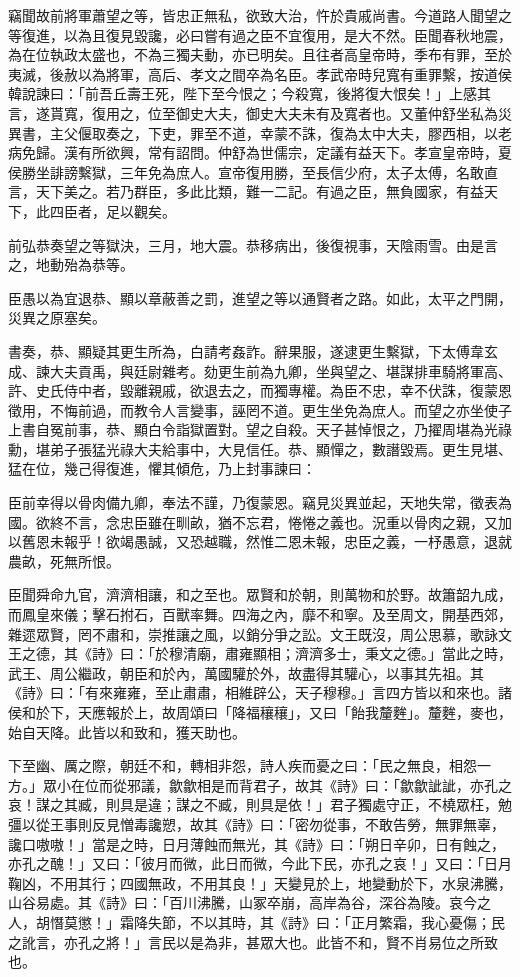 \begin{pinyinscope}
竊聞故前將軍蕭望之等，皆忠正無私，欲致大治，忤於貴戚尚書。今道路人聞望之等復進，以為且復見毀讒，必曰嘗有過之臣不宜復用，是大不然。臣聞春秋地震，為在位執政太盛也，不為三獨夫動，亦已明矣。且往者高皇帝時，季布有罪，至於夷滅，後赦以為將軍，高后、孝文之間卒為名臣。孝武帝時兒寬有重罪繫，按道侯韓說諫曰：「前吾丘壽王死，陛下至今恨之；今殺寬，後將復大恨矣！」上感其言，遂貰寬，復用之，位至御史大夫，御史大夫未有及寬者也。又董仲舒坐私為災異書，主父偃取奏之，下吏，罪至不道，幸蒙不誅，復為太中大夫，膠西相，以老病免歸。漢有所欲興，常有詔問。仲舒為世儒宗，定議有益天下。孝宣皇帝時，夏侯勝坐誹謗繫獄，三年免為庶人。宣帝復用勝，至長信少府，太子太傅，名敢直言，天下美之。若乃群臣，多此比類，難一二記。有過之臣，無負國家，有益天下，此四臣者，足以觀矣。

前弘恭奏望之等獄決，三月，地大震。恭移病出，後復視事，天陰雨雪。由是言之，地動殆為恭等。

臣愚以為宜退恭、顯以章蔽善之罰，進望之等以通賢者之路。如此，太平之門開，災異之原塞矣。

書奏，恭、顯疑其更生所為，白請考姦詐。辭果服，遂逮更生繫獄，下太傅韋玄成、諫大夫貢禹，與廷尉雜考。劾更生前為九卿，坐與望之、堪謀排車騎將軍高、許、史氏侍中者，毀離親戚，欲退去之，而獨專權。為臣不忠，幸不伏誅，復蒙恩徵用，不悔前過，而教令人言變事，誣罔不道。更生坐免為庶人。而望之亦坐使子上書自冤前事，恭、顯白令詣獄置對。望之自殺。天子甚悼恨之，乃擢周堪為光祿勳，堪弟子張猛光祿大夫給事中，大見信任。恭、顯憚之，數譖毀焉。更生見堪、猛在位，幾己得復進，懼其傾危，乃上封事諫曰：

臣前幸得以骨肉備九卿，奉法不謹，乃復蒙恩。竊見災異並起，天地失常，徵表為國。欲終不言，念忠臣雖在甽畝，猶不忘君，惓惓之義也。況重以骨肉之親，又加以舊恩未報乎！欲竭愚誠，又恐越職，然惟二恩未報，忠臣之義，一杼愚意，退就農畝，死無所恨。

臣聞舜命九官，濟濟相讓，和之至也。眾賢和於朝，則萬物和於野。故簫韶九成，而鳳皇來儀；擊石拊石，百獸率舞。四海之內，靡不和寧。及至周文，開基西郊，雜遝眾賢，罔不肅和，崇推讓之風，以銷分爭之訟。文王既沒，周公思慕，歌詠文王之德，其《詩》曰：「於穆清廟，肅雍顯相；濟濟多士，秉文之德。」當此之時，武王、周公繼政，朝臣和於內，萬國驩於外，故盡得其驩心，以事其先祖。其《詩》曰：「有來雍雍，至止肅肅，相維辟公，天子穆穆。」言四方皆以和來也。諸侯和於下，天應報於上，故周頌曰「降福穰穰」，又曰「飴我釐麰」。釐麰，麥也，始自天降。此皆以和致和，獲天助也。

下至幽、厲之際，朝廷不和，轉相非怨，詩人疾而憂之曰：「民之無良，相怨一方。」眾小在位而從邪議，歙歙相是而背君子，故其《詩》曰：「歙歙訿訿，亦孔之哀！謀之其臧，則具是違；謀之不臧，則具是依！」君子獨處守正，不橈眾枉，勉彊以從王事則反見憎毒讒愬，故其《詩》曰：「密勿從事，不敢告勞，無罪無辜，讒口嗷嗷！」當是之時，日月薄蝕而無光，其《詩》曰：「朔日辛卯，日有蝕之，亦孔之醜！」又曰：「彼月而微，此日而微，今此下民，亦孔之哀！」又曰：「日月鞠凶，不用其行；四國無政，不用其良！」天變見於上，地變動於下，水泉沸騰，山谷易處。其《詩》曰：「百川沸騰，山冢卒崩，高岸為谷，深谷為陵。哀今之人，胡憯莫懲！」霜降失節，不以其時，其《詩》曰：「正月繁霜，我心憂傷；民之訛言，亦孔之將！」言民以是為非，甚眾大也。此皆不和，賢不肖易位之所致也。


\end{pinyinscope}

